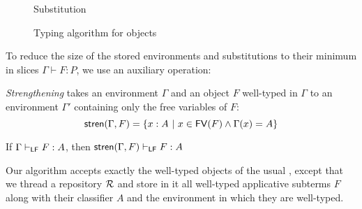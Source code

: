 \documentclass{llncs}
\begin{document}
\begin{figure*}
  \begin{mathpar}

  \end{mathpar}

  \qquad
  {Substitution}

  \begin{mathpar}



  \end{mathpar}

  \caption{Typing algorithm for objects}
  \label{fig:obj-typing}
\end{figure*}

To reduce the size of the stored environments and substitutions to
their minimum in slices $\Gamma\vdash F : P$, we use an auxiliary
operation:

\begin{definition}
  \emph{Strengthening} takes an environment $\Gamma$ and an object $F$
  well-typed in $\Gamma$ to an environment $\Gamma'$ containing only
  the free variables of $F$:
$$
\stren{\Gamma,F} = \{x : A\ |\ x\in \FV{F} \wedge \Gamma(x)=A\}
$$
\end{definition}

\begin{lemma}
  If $\jlfm\Gamma F A$, then $\jlfm{\stren{\Gamma, F}} F A$
\end{lemma}

Our algorithm accepts exactly the well-typed objects of the usual \LF,
except that we thread a repository $\mr$ and store in it all
well-typed applicative subterms $F$ along with their classifier $A$
and the environment in which they are well-typed.
\end{document}
